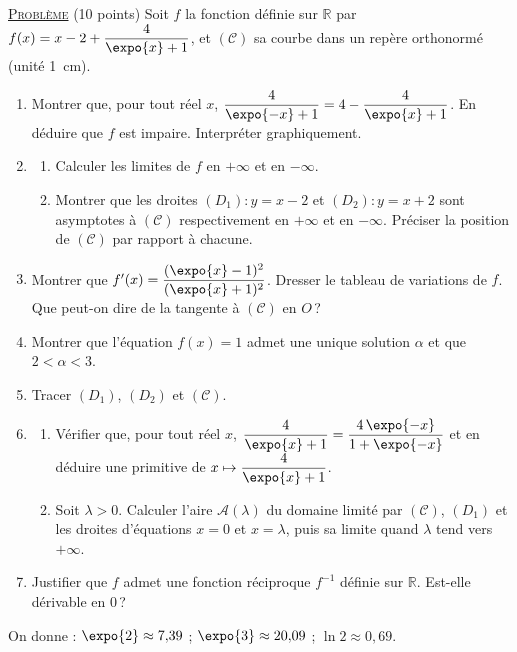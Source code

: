 \noindent \underline{\textsc{Probl\`eme}} (10 points) \newline
Soit $f$ la fonction d\'efinie sur $\mathbb{R}$ par $f(x) = x - 2 + \dfrac{4}{\expo{x} + 1}$, et $(\mathscr{C})$ sa courbe
dans un rep\`ere orthonorm\'e (unit\'e 1~cm).
\begin{enumerate}
      \item Montrer que, pour tout r\'eel $x$, $\dfrac{4}{\expo{-x} + 1} = 4 - \dfrac{4}{\expo{x} + 1}$.
            En d\'eduire que $f$ est impaire. Interpr\'eter graphiquement.
      \item \begin{enumerate}
            \item Calculer les limites de $f$ en $+\infty$ et en $-\infty$.
            \item Montrer que les droites $(D_1) : y = x - 2$ et $(D_2) : y = x + 2$ sont asymptotes \`a $(\mathscr{C})$
                  respectivement en $+\infty$ et en $-\infty$. Pr\'eciser la position de $(\mathscr{C})$ par rapport \`a chacune.
            \end{enumerate}
      \item Montrer que $f'(x) = \dfrac{(\expo{x} - 1)^2}{(\expo{x} + 1)^2}$. Dresser le tableau de variations de $f$.
            Que peut-on dire de la tangente \`a $(\mathscr{C})$ en $O$\,?
      \item Montrer que l'\'equation $f(x) = 1$ admet une unique solution $\alpha$ et que $2 < \alpha < 3$.
      \item Tracer $(D_1)$, $(D_2)$ et $(\mathscr{C})$.
      \item \begin{enumerate}
            \item V\'erifier que, pour tout r\'eel $x$, $\dfrac{4}{\expo{x} + 1} = \dfrac{4\,\expo{-x}}{1 + \expo{-x}}$
                  et en d\'eduire une primitive de $x \mapsto \dfrac{4}{\expo{x} + 1}$.
            \item Soit $\lambda > 0$. Calculer l'aire $\mathscr{A}(\lambda)$ du domaine limit\'e par $(\mathscr{C})$, $(D_1)$ et
                  les droites d'\'equations $x = 0$ et $x = \lambda$, puis sa limite quand $\lambda$ tend vers $+\infty$.
            \end{enumerate}
      \item Justifier que $f$ admet une fonction r\'eciproque $f^{-1}$ d\'efinie sur $\mathbb{R}$. Est-elle d\'erivable en $0$\,?
\end{enumerate}
\begin{center}
On donne : $\expo{2} \approx 7{,}39$ ; $\expo{3} \approx 20{,}09$ ; $\ln 2 \approx 0{,}69$.
\end{center}

